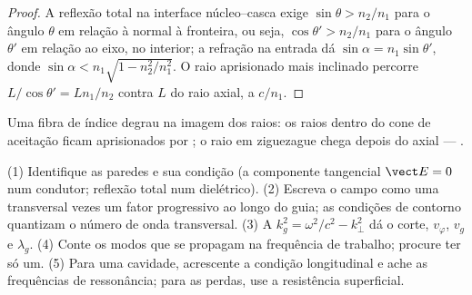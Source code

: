 \begin{proof}
A reflexão total na interface núcleo--casca exige $\sin\theta >
n_2/n_1$ para o ângulo $\theta$ em relação à normal à fronteira, ou seja, $\cos
\theta' > n_2/n_1$ para o ângulo $\theta'$ em relação ao eixo, no interior; a refração
na entrada dá $\sin\alpha = n_1\sin\theta'$, donde $\sin\alpha < n_1\sqrt{1
- n_2^2/n_1^2}$. O raio aprisionado mais inclinado percorre $L/\cos\theta' = Ln_1/n_2$
contra $L$ do raio axial, a $c/n_1$.
\end{proof}

\begin{omfigure}

{\small Uma fibra de índice degrau na imagem dos raios: os raios dentro do
cone de aceitação ficam aprisionados por ; o raio em
ziguezague chega depois do axial --- .}
\end{omfigure}

\begin{method}\label{met:b2:guided-waves:method}
(1) Identifique as paredes e sua condição (a componente tangencial $\vect E = 0$ num
condutor; reflexão total num dielétrico). (2) Escreva o campo
como uma  transversal vezes um fator progressivo ao longo do
guia; as condições de contorno quantizam o número de onda transversal.
(3) A  $k_g^2 = \omega^2/c^2 - k_\perp^2$ dá o
corte, $v_\varphi$, $v_g$ e $\lambda_g$. (4) Conte os modos que se propagam na
frequência de trabalho; procure ter só um. (5) Para uma cavidade, acrescente a condição
longitudinal e ache as frequências de ressonância; para as perdas, use a
resistência superficial.
\end{method}

